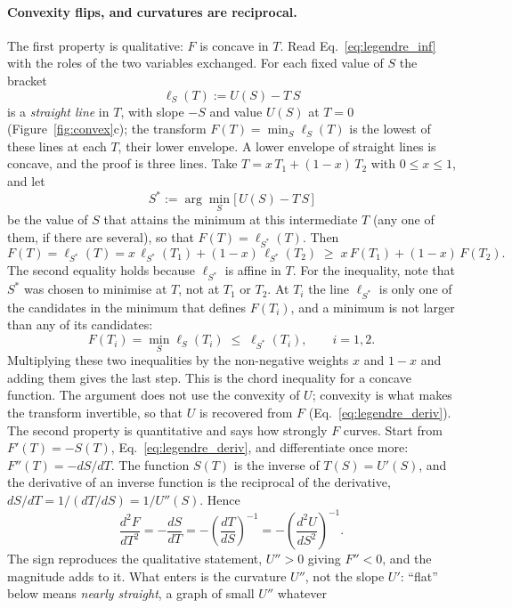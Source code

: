 \documentclass[10pt,a4paper]{article}
\theoremstyle{remark}
\begin{document}
\paragraph{Convexity flips, and curvatures are reciprocal.} The first
property is qualitative: $F$ is concave in $T$. Read Eq.~\eqref{eq:legendre_inf}
with the roles of the two variables exchanged. For each fixed value of $S$ the
bracket
\[
  \ell_S(T):= U(S)-T\,S
\]
is a \emph{straight line} in $T$, with slope $-S$ and value $U(S)$ at $T=0$
(Figure~\ref{fig:convex}c); the transform $F(T)=\min_S\ell_S(T)$ is the lowest of these lines at each $T$,
their lower envelope. A lower envelope of straight lines is concave, and the
proof is three lines. Take $T=x\,T_1+(1-x)\,T_2$ with $0\leq x\leq1$, and let
\[
  S^{\ast}:=\arg\min_{S}\big[\,U(S)-T\,S\,\big]
\]
be the value of $S$ that attains the minimum at this intermediate $T$ (any one
of them, if there are several), so that $F(T)=\ell_{S^{\ast}}(T)$. Then
\[
  F(T)=\ell_{S^{\ast}}(T)
  =x\,\ell_{S^{\ast}}(T_1)+(1-x)\,\ell_{S^{\ast}}(T_2)
  \;\geq\;x\,F(T_1)+(1-x)\,F(T_2) .
\]
The second equality holds because $\ell_{S^{\ast}}$ is affine in $T$. For the
inequality, note that $S^{\ast}$ was chosen to minimise at $T$, not at $T_1$ or
$T_2$. At $T_i$ the line $\ell_{S^{\ast}}$ is only one of the candidates in the
minimum that defines $F(T_i)$, and a minimum is not larger than any of its
candidates:
\[
  F(T_i)=\min_S\ell_S(T_i)\;\leq\;\ell_{S^{\ast}}(T_i) ,\qquad i=1,2 .
\]
Multiplying these two inequalities by the non-negative weights $x$ and $1-x$
and adding them gives the last step. This is the chord inequality for a concave
function. The argument does not use the convexity of $U$; convexity is
what makes the transform invertible, so that $U$ is recovered from $F$
(Eq.~\eqref{eq:legendre_deriv}).
The second property is quantitative and says how strongly $F$ curves. Start
from $F'(T)=-S(T)$, Eq.~\eqref{eq:legendre_deriv}, and differentiate once
more: $F''(T)=-dS/dT$. The function $S(T)$ is the inverse of $T(S)=U'(S)$,
and the derivative of an inverse function is the reciprocal of the derivative,
$dS/dT=1/(dT/dS)=1/U''(S)$. Hence
\begin{equation}\label{eq:reciprocal}
  \frac{d^{2}F}{dT^{2}}=-\frac{dS}{dT}=-\left(\frac{dT}{dS}\right)^{-1}
  =-\left(\frac{d^{2}U}{dS^{2}}\right)^{-1} .
\end{equation}
The sign reproduces the qualitative statement, $U''>0$ giving $F''<0$, and
the magnitude adds to it. What enters is the curvature $U''$, not the slope
$U'$: ``flat'' below means \emph{nearly straight}, a graph of small $U''$ whatever
\end{document}
